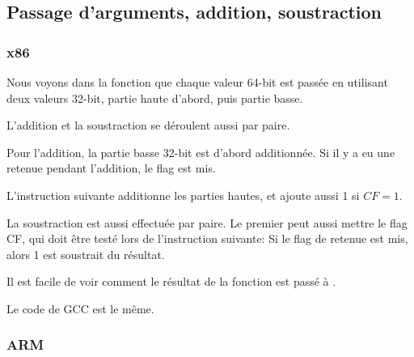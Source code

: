 ﻿\subsection{Passage d'arguments, addition, soustraction}



\subsubsection{x86}



Nous voyons dans la fonction  que chaque valeur 64-bit est passée
en utilisant deux valeurs 32-bit, partie haute d'abord, puis partie basse.

L'addition et la soustraction se déroulent aussi par paire.

Pour l'addition, la partie basse 32-bit est d'abord additionnée.
Si il y a eu une retenue pendant l'addition, le flag  est mis.

L'instruction suivante  additionne les parties hautes, et ajoute aussi 1
si $CF=1$.

La soustraction est aussi effectuée par paire.
Le premier \SUB peut aussi mettre le flag CF, qui doit être testé lors de l'instruction
 suivante:
Si le flag de retenue est mis, alors 1 est soustrait du résultat.

Il est facile de voir comment le résultat de la fonction  est passé
à \printf{}.



Le code de GCC est le même.

\subsubsection{ARM}




